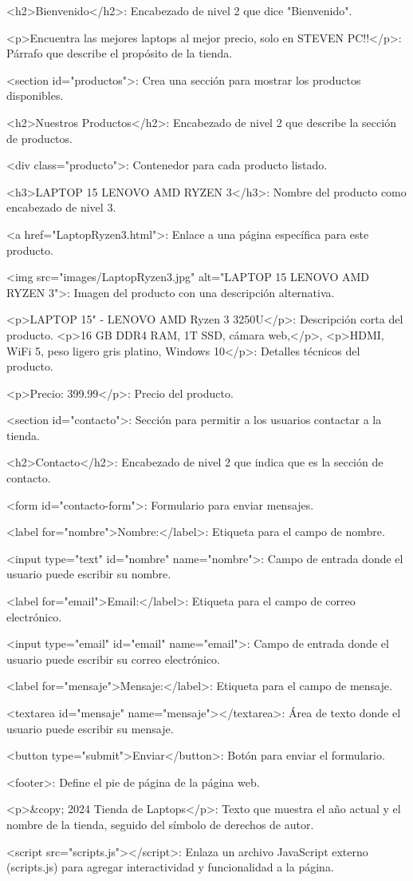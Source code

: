 <h2>Bienvenido</h2>: Encabezado de nivel 2 que dice "Bienvenido".

<p>Encuentra las mejores laptops al mejor precio, solo en STEVEN PC!!</p>: Párrafo 
que describe el propósito de la tienda.

<section id="productos">: Crea una sección para mostrar los productos disponibles.

<h2>Nuestros Productos</h2>: Encabezado de nivel 2 que describe la sección de productos.

<div class="producto">: Contenedor para cada producto listado.

<h3>LAPTOP 15 LENOVO AMD RYZEN 3</h3>: Nombre del producto como encabezado de nivel 3.

<a href="LaptopRyzen3.html">: Enlace a una página específica para este producto.

<img src="images/LaptopRyzen3.jpg" alt="LAPTOP 15 LENOVO AMD RYZEN 3">: Imagen del 
producto con una descripción alternativa.

<p>LAPTOP 15" - LENOVO AMD Ryzen 3 3250U</p>: Descripción corta del producto.
<p>16 GB DDR4 RAM, 1T SSD, cámara web,</p>, <p>HDMI, WiFi 5, peso ligero gris platino,
 Windows 10</p>: Detalles técnicos del producto.

<p>Precio: 399.99</p>: Precio del producto.

<section id="contacto">: Sección para permitir a los usuarios contactar a la tienda.

<h2>Contacto</h2>: Encabezado de nivel 2 que indica que es la sección de contacto.

<form id="contacto-form">: Formulario para enviar mensajes.

<label for="nombre">Nombre:</label>: Etiqueta para el campo de nombre.

<input type="text" id="nombre" name="nombre">: Campo de entrada donde el usuario 
puede escribir su nombre.

<label for="email">Email:</label>: Etiqueta para el campo de correo electrónico.

<input type="email" id="email" name="email">: Campo de entrada donde el usuario 
puede escribir su correo electrónico.

<label for="mensaje">Mensaje:</label>: Etiqueta para el campo de mensaje.

<textarea id="mensaje" name="mensaje"></textarea>: Área de texto donde el usuario
puede escribir su mensaje.

<button type="submit">Enviar</button>: Botón para enviar el formulario.

<footer>: Define el pie de página de la página web.

<p>&copy; 2024 Tienda de Laptops</p>: Texto que muestra el año actual y
el nombre de la tienda, seguido del símbolo de derechos de autor.

<script src="scripts.js"></script>: Enlaza un archivo JavaScript 
externo (scripts.js) para agregar interactividad y funcionalidad a la página.


